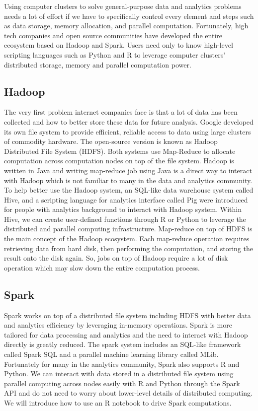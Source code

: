 \documentclass[
  12pt,
]{krantz}
\begin{document}
Using computer clusters to solve general-purpose data and analytics problems needs a lot of effort if we have to specifically control every element and steps such as data storage, memory allocation, and parallel computation. Fortunately, high tech companies and open source communities have developed the entire ecosystem based on Hadoop and Spark. Users need only to know high-level scripting languages such as Python and R to leverage computer clusters' distributed storage, memory and parallel computation power.

\hypertarget{hadoop}{%
\subsection{Hadoop}\label{hadoop}}

The very first problem internet companies face is that a lot of data has been collected and how to better store these data for future analysis. Google developed its own file system to provide efficient, reliable access to data using large clusters of commodity hardware. The open-source version is known as Hadoop Distributed File System (HDFS). Both systems use Map-Reduce to allocate computation across computation nodes on top of the file system. Hadoop is written in Java and writing map-reduce job using Java is a direct way to interact with Hadoop which is not familiar to many in the data and analytics community. To help better use the Hadoop system, an SQL-like data warehouse system called Hive, and a scripting language for analytics interface called Pig were introduced for people with analytics background to interact with Hadoop system. Within Hive, we can create user-defined functions through R or Python to leverage the distributed and parallel computing infrastructure. Map-reduce on top of HDFS is the main concept of the Hadoop ecosystem. Each map-reduce operation requires retrieving data from hard disk, then performing the computation, and storing the result onto the disk again. So, jobs on top of Hadoop require a lot of disk operation which may slow down the entire computation process.

\hypertarget{spark}{%
\subsection{Spark}\label{spark}}

Spark works on top of a distributed file system including HDFS with better data and analytics efficiency by leveraging in-memory operations. Spark is more tailored for data processing and analytics and the need to interact with Hadoop directly is greatly reduced. The spark system includes an SQL-like framework called Spark SQL and a parallel machine learning library called MLib. Fortunately for many in the analytics community, Spark also supports R and Python. We can interact with data stored in a distributed file system using parallel computing across nodes easily with R and Python through the Spark API and do not need to worry about lower-level details of distributed computing. We will introduce how to use an R notebook to drive Spark computations.
\end{document}
